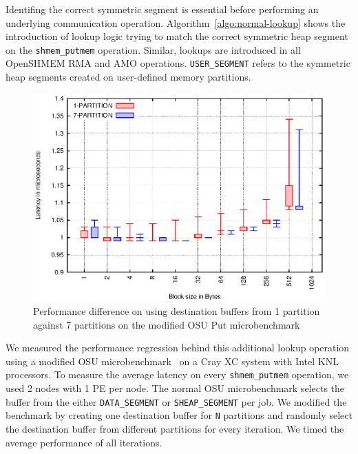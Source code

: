 Identifing the correct symmetric segment is essential before
performing an
underlying communication operation. %
Algorithm~\ref{algo:normal-lookup} shows the introduction of lookup
logic trying to match the correct symmetric heap segment on the
\texttt{shmem\_putmem} operation. Similar, lookups are introduced in
all OpenSHMEM RMA and AMO operations. \texttt{USER\_SEGMENT} refers to
the symmetric heap segments created on user-defined memory partitions.

\begin{figure}[h!]
    \vspace{-30pt}
    \centering
    \includegraphics[width=\linewidth]{graph/osu-put.eps}
    \caption{Performance difference on using destination buffers
    from 1 partition against 7 partitions on the modified OSU Put
    microbenchmark}
    \label{graph:lookup}
    \vspace{-20pt}
\end{figure}

We measured the performance regression behind this additional lookup
operation using a modified OSU microbenchmark~\cite{pgas-benchmarks}
on a Cray XC system with Intel KNL processors. To measure the average
latency on every \texttt{shmem\_putmem} operation, we used 2 nodes
with 1 PE per node.
The normal OSU microbenchmark selects the buffer from the either
\texttt{DATA\_SEGMENT} or \texttt{SHEAP\_SEGMENT}
per job. We modified the benchmark by creating
one destination buffer for \texttt{N} partitions and randomly select
the destination buffer from different partitions for every iteration.
We timed the average performance of all iterations.%

